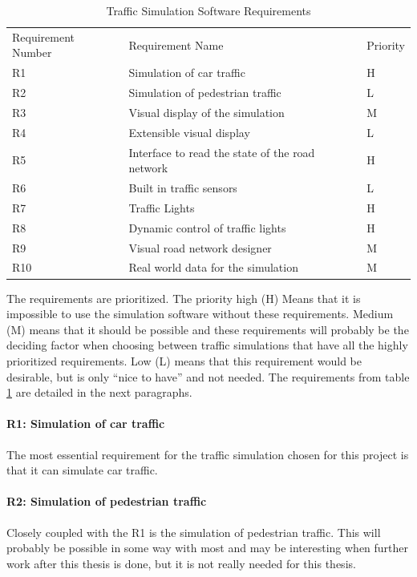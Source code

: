 \begin{table}[!ht]
  	\centering
  	\begin{tabular}{lll}
		Requirement Number & Requirement Name & Priority \\[10pt]
		R1 & Simulation of car traffic & H \\[10pt]
		R2 & Simulation of pedestrian traffic & L \\[10pt]
		R3 & Visual display of the simulation & M \\[10pt]
		R4 & Extensible visual display & L \\[10pt]
		R5 & Interface to read the state of the road network & H \\[10pt]
		R6 & Built in traffic sensors & L \\[10pt]
		R7 & Traffic Lights & H \\[10pt]
		R8 & Dynamic control of traffic lights & H \\[10pt]
		R9 & Visual road network designer & M \\[10pt]
		R10 & Real world data for the simulation & M \\[10pt]
	\end{tabular}
  	\caption{Traffic Simulation Software Requirements}
  	\label{simulationRequirements}
\end{table}

The requirements are prioritized. The priority high (H) Means that it is impossible to use the simulation software without these requirements. Medium (M) means that it should be possible and these requirements will probably be the deciding factor when choosing between traffic simulations that have all the highly prioritized requirements. Low (L) means that this requirement would be desirable, but is only ``nice to have'' and not needed. The requirements from table \ref{simulationRequirements} are detailed in the next paragraphs.

\paragraph{R1: Simulation of car traffic} The most essential requirement for the traffic simulation chosen for this project is that it can simulate car traffic.

\paragraph{R2: Simulation of pedestrian traffic} Closely coupled with the R1 is the simulation of pedestrian traffic. This will probably be possible in some way with most and may be interesting when further work after this thesis is done, but it is not really needed for this thesis.

